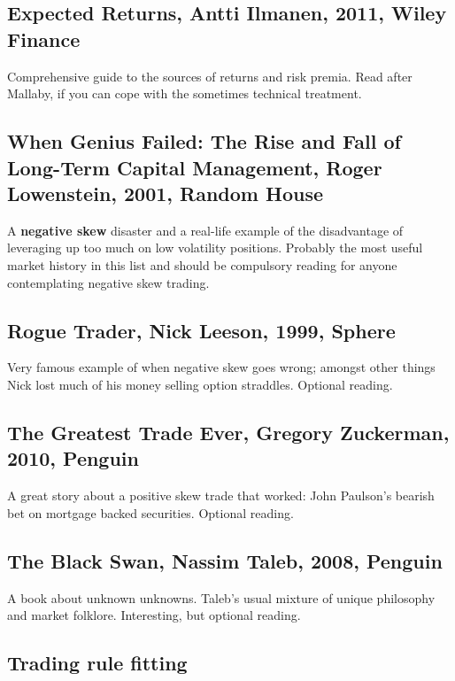 \subsection*{Expected Returns, Antti Ilmanen, 2011, Wiley Finance}

Comprehensive guide to the sources of returns and risk premia. Read after Mallaby, if you can cope with the sometimes technical treatment.

\subsection*{When Genius Failed: The Rise and Fall of Long-Term Capital Management, Roger Lowenstein, 2001, Random House}

A \textbf{negative skew} disaster and a real-life example of the disadvantage of leveraging up too much on low volatility positions. Probably the most useful market history in this list and should be compulsory reading for anyone contemplating negative skew trading.

\subsection*{Rogue Trader, Nick Leeson, 1999, Sphere}

Very famous example of when negative skew goes wrong; amongst other things Nick lost much of his money selling option straddles. Optional reading.

\subsection*{The Greatest Trade Ever, Gregory Zuckerman, 2010, Penguin}

A great story about a positive skew trade that worked: John Paulson's bearish bet on mortgage backed securities. Optional reading.

\subsection*{The Black Swan, Nassim Taleb, 2008, Penguin}

A book about unknown unknowns. Taleb's usual mixture of unique philosophy and market folklore. Interesting, but optional reading.

\subsection*{Trading rule fitting}

